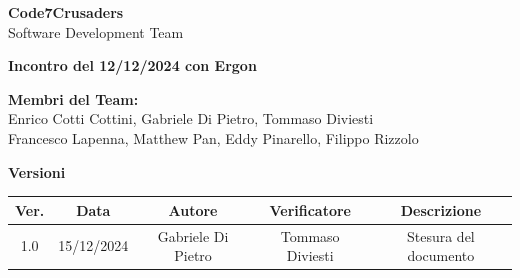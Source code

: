 \documentclass{article}
\begin{document}
\begin{titlepage}
    {\Huge \textbf{Code7Crusaders}}\\
    \vspace{0.5cm}
    {\Large Software Development Team}\\
    \vspace{2cm}
    
    {\large \textbf{Incontro del 12/12/2024 con Ergon}}\\ %
    \vspace{5cm}                           %
    
    
    \textbf{Membri del Team:}\\
    Enrico Cotti Cottini, Gabriele Di Pietro, Tommaso Diviesti \\
    Francesco Lapenna, Matthew Pan, Eddy Pinarello, Filippo Rizzolo \\
    \vspace{0.5cm}
    
    \vspace{1cm}
\end{titlepage}



\newpage
\begin{table}[h!]
\centering
\textbf{Versioni} \\ %
\vspace{2mm} %
\begin{tabular}{|c|c|c|c|c|}
    \hline
    \textbf{Ver.} & \textbf{Data} & \textbf{Autore} & \textbf{Verificatore} & \textbf{Descrizione} \\
    \hline
    1.0 & 15/12/2024 & Gabriele Di Pietro & Tommaso Diviesti & Stesura del documento \\ 
    \hline                                  %
\end{tabular}
\end{table}



\newpage
\tableofcontents
\end{document}
